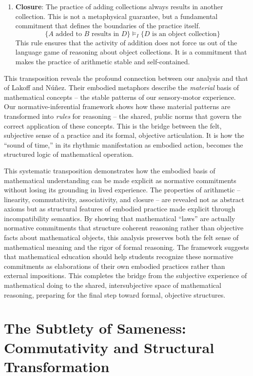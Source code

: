 \documentclass[12pt]{book}
\begin{document}
\begin{enumerate}
    \item \textbf{Closure}: The practice of adding collections always results in another collection. This is not a metaphysical guarantee, but a fundamental commitment that defines the boundaries of the practice itself. 
    \[
    \{ A \text{ added to } B \text{ results in } D \} \vDash_{I} \{ D \text{ is an object collection} \}
    \]
    This rule ensures that the activity of addition does not force us out of the language game of reasoning about object collections. It is a commitment that makes the practice of arithmetic stable and self-contained.
\end{enumerate}

This transposition reveals the profound connection between our analysis and that of Lakoff and Núñez. Their embodied metaphors describe the \textit{material} basis of mathematical concepts -- the stable patterns of our sensory-motor experience. Our normative-inferential framework shows how these material patterns are transformed into \textit{rules} for reasoning -- the shared, public norms that govern the correct application of these concepts. This is the bridge between the felt, subjective sense of a practice and its formal, objective articulation. It is how the ``sound of time,'' in its rhythmic manifestation as embodied action, becomes the structured logic of mathematical operation.

This systematic transposition demonstrates how the embodied basis of mathematical understanding can be made explicit as normative commitments without losing its grounding in lived experience. The properties of arithmetic -- linearity, commutativity, associativity, and closure -- are revealed not as abstract axioms but as structural features of embodied practice made explicit through incompatibility semantics. By showing that mathematical ``laws'' are actually normative commitments that structure coherent reasoning rather than objective facts about mathematical objects, this analysis preserves both the felt sense of mathematical meaning and the rigor of formal reasoning. The framework suggests that mathematical education should help students recognize these normative commitments as elaborations of their own embodied practices rather than external impositions. This completes the bridge from the subjective experience of mathematical doing to the shared, intersubjective space of mathematical reasoning, preparing for the final step toward formal, objective structures.

\section{The Subtlety of Sameness: Commutativity and Structural Transformation}
\end{document}
